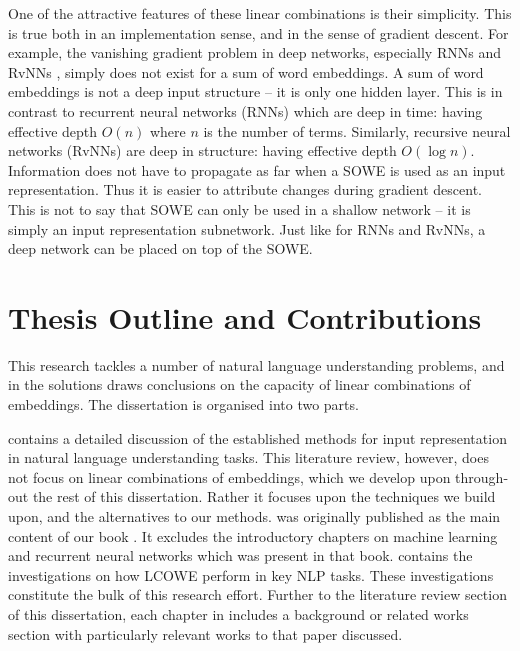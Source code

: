 \documentclass{book}
\begin{document}
One of the attractive features of these linear combinations is their simplicity.
This is true both in an implementation sense, and in the sense of gradient descent.
For example, the vanishing gradient problem in deep networks, especially RNNs \citep{bengio1994learning}  and RvNNs \citep{socher2014recursive},
simply does not exist for a sum of word embeddings.
A sum of word embeddings is not a deep input structure -- it is only one hidden layer.
This is in contrast to recurrent neural networks (RNNs) which are deep in time: having effective depth $O(n)$ where $n$ is the number of terms.
Similarly, recursive neural networks (RvNNs) are deep in structure: having effective depth $O(\log n)$.
Information does not have to propagate as far when a SOWE is used as an input representation.
Thus it is easier to attribute changes during gradient descent.
This is not to say that SOWE can only be used in a shallow network -- it is simply an input representation subnetwork.
Just like for RNNs and RvNNs, a deep network can be placed on top of the SOWE.


\section{Thesis Outline and Contributions}
This research tackles a number of natural language understanding problems, and in the solutions draws conclusions on the capacity of linear combinations of embeddings.
The dissertation is organised into two parts.

 contains a detailed discussion of the established methods for input representation in natural language understanding tasks.
This literature review, however, does not focus on linear combinations of embeddings, which we develop upon through-out the rest of this dissertation.
Rather it focuses upon the techniques we build upon, and the alternatives to our methods.
 was originally published as the main content of our book  \citep{NRoNL}.
It excludes the introductory chapters on machine learning and recurrent neural networks which was present in that book.
 contains the investigations on how LCOWE perform in key NLP tasks.
These investigations constitute the bulk of this research effort.
Further to the literature review section of this dissertation, each chapter in  includes a background or related works section with particularly relevant works to that paper discussed.
\end{document}
